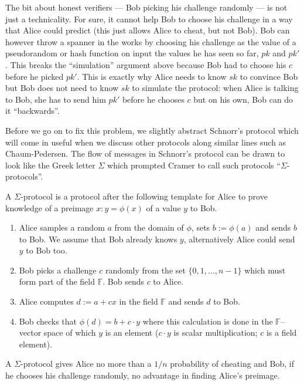 \documentclass[envcountsame]{llncs}
\begin{document}
The bit about honest verifiers --- Bob picking his challenge randomly --- is not
just a technicality. For sure, it cannot help Bob to choose his challenge in a
way that Alice could predict (this just allows Alice to cheat, but not Bob). Bob
can however throw a spanner in the works by choosing his challenge as the value
of a pseudorandom or hash function on input the values he has seen so far, $pk$
and $pk'$. This breaks the ``simulation'' argument above because Bob had to
choose his $c$ before he picked $pk'$. This is exactly why Alice needs to know
$sk$ to convince Bob but Bob does not need to know $sk$ to simulate the
protocol: when Alice is talking to Bob, she has to send him $pk'$ before he
chooses $c$ but on his own, Bob can do it ``backwards''.

Before we go on to fix this problem, we slightly abstract Schnorr's protocol
which will come in useful when we discuss other protocols along similar lines
such as Chaum-Pedersen. The flow of messages in Schnorr's protocol can be drawn
to look like the Greek letter $\Sigma$ which prompted Cramer \cite{C96} to call
such protocols ``$\Sigma$-protocols''.

\begin{definition}
A $\Sigma$-protocol is a protocol after the following template for Alice to
prove knowledge of a preimage $x: y = \phi(x)$ of a value $y$ to Bob.
\begin{enumerate}
\item Alice samples a random $a$ from the domain of $\phi$, sets $b := \phi(a)$
and sends $b$ to Bob. We assume that Bob already knows $y$, alternatively Alice
could send $y$ to Bob too.
\item Bob picks a challenge $c$ randomly from the set $\{0, 1, \ldots, n-1\}$
which must form part of the field $\mathbb F$. Bob sends $c$ to Alice.
\item Alice computes $d := a + cx$ in the field $\mathbb F$ and sends $d$ to
Bob.
\item Bob checks that $\phi(d) = b + c \cdot y$ where this calculation is done
in the $\mathbb F$--vector space of which $y$ is an element ($c \cdot y$ is
scalar multiplication; $c$ is a field element).
\end{enumerate}
\end{definition}

A $\Sigma$-protocol gives Alice no more than a $1/n$ probability of cheating and
Bob, if he chooses his challenge randomly, no advantage in finding Alice's
preimage.
\end{document}
